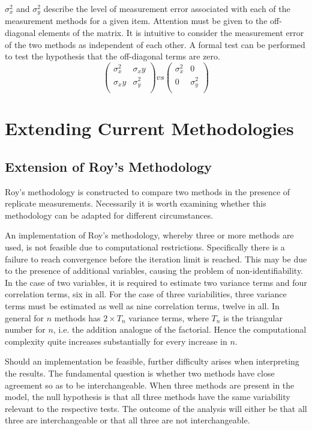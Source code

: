 \documentclass[12pt, a4paper]{report}
\theoremstyle{plain}
\theoremstyle{definition}
\theoremstyle{remark}
\begin{document}
$\sigma^2_x$ and $\sigma^2_y$ describe the level of measurement error associated with each of the measurement methods for a given item. Attention must be given to the off-diagonal elements of the matrix. It is intuitive to consider the measurement error of the two methods as independent of each other. A formal test can be performed to test the hypothesis that the off-diagonal terms are zero.
\[ \left(
\begin{array}{cc}
\sigma^2_x & \sigma_xy \\
\sigma_xy & \sigma^2_y \\
\end{array}
\right) vs \left(
\begin{array}{cc}
\sigma^2_x & 0 \\
0 & \sigma^2_y \\
\end{array}
\right)
\]


\chapter{Extending Current Methodologies}
\section{Extension of Roy's Methodology}
Roy's methodology is constructed to compare two methods in the presence of replicate measurements. Necessarily it is worth examining whether this methodology can be adapted for different circumstances.

An implementation of Roy's methodology, whereby three or more methods are used, is not feasible due to computational restrictions. Specifically there is a failure to reach convergence before the iteration limit is reached. This may be due to the presence of additional variables, causing the problem of non-identifiability. In the case of two variables, it is required to estimate two variance terms and four correlation terms, six in all. For the case of three variabilities, three variance terms must be estimated as well as nine correlation terms, twelve in all. In general for $n$ methods has $2 \times T_{n}$ variance terms, where $T_n$ is the triangular number for $n$, i.e. the addition analogue of the factorial. Hence the computational complexity quite increases substantially for every increase in $n$.

Should an implementation be feasible, further difficulty arises when interpreting the results. The fundamental question is whether two methods have close agreement so as to be interchangeable. When three methods are present in the model, the null hypothesis is that all three methods have the same variability relevant to the respective tests. The outcome of the analysis will either be that all three are interchangeable or that all three are not interchangeable.
\end{document}
